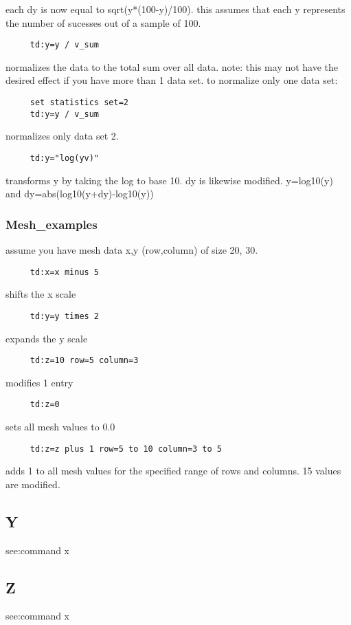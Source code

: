 each  dy is now equal to sqrt(y*(100-y)/100).  this assumes that each y
represents the number of sucesses out of a sample of 100.  
\begin{verbatim}
     td:y=y / v_sum 
\end{verbatim}
normalizes  the  data  to the total sum over all data.  note:  this may
not have the desired effect if you have  more  than  1  data  set.   to
normalize only one data set:  
\begin{verbatim}
     set statistics set=2 
     td:y=y / v_sum 
\end{verbatim}
normalizes only data set 2.  
\begin{verbatim}
     td:y="log(yv)" 
\end{verbatim}
transforms  y  by  taking the log to base 10.  dy is likewise modified.
y=log10(y) and dy=abs(log10(y+dy)-log10(y)) 
\subsubsection{Mesh\_examples}
assume you have mesh data x,y (row,column) of size 20, 30.  
\begin{verbatim}
     td:x=x minus 5 
\end{verbatim}
shifts the x scale 
\begin{verbatim}
     td:y=y times 2 
\end{verbatim}
expands the y scale 
\begin{verbatim}
     td:z=10 row=5 column=3 
\end{verbatim}
modifies 1 entry 
\begin{verbatim}
     td:z=0 
\end{verbatim}
sets all mesh values to 0.0 
\begin{verbatim}
     td:z=z plus 1 row=5 to 10 column=3 to 5 
\end{verbatim}
adds  1 to all mesh values for the specified range of rows and columns.
15 values are modified.  
\subsection{Y}
see:command x 
\subsection{Z}
see:command x 
